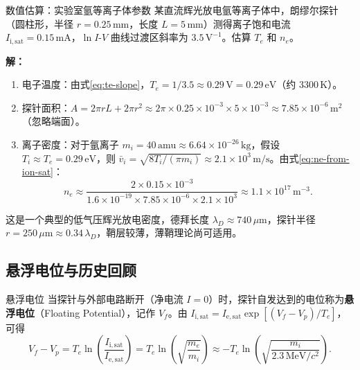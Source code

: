 \begin{example}{数值估算：实验室氩等离子体参数}{}{}
某直流辉光放电氩等离子体中，朗缪尔探针（圆柱形，半径 $r = 0.25\,\mathrm{mm}$，长度 $L = 5\,\mathrm{mm}$）测得离子饱和电流 $I_{\mathrm{i,sat}} = 0.15\,\mathrm{mA}$，$\ln I$-$V$ 曲线过渡区斜率为 $3.5\,\mathrm{V}^{-1}$。估算 $T_e$ 和 $n_e$。

\textbf{解：}
\begin{enumerate}
    \item 电子温度：由式\eqref{eq:te-slope}，$T_e = 1/3.5 \approx 0.29\,\mathrm{V} = 0.29\,\mathrm{eV}$（约 $3300\,\mathrm{K}$）。
    \item 探针面积：$A = 2\pi r L + 2\pi r^2 \approx 2\pi \times 0.25\times 10^{-3}\times 5\times 10^{-3} \approx 7.85\times 10^{-6}\,\mathrm{m}^2$（忽略端面）。
    \item 离子密度：对于氩离子 $m_i = 40\,\mathrm{amu} \approx 6.64\times 10^{-26}\,\mathrm{kg}$，假设 $T_i \approx T_e = 0.29\,\mathrm{eV}$，则 $\bar{v}_i = \sqrt{8T_i/(\pi m_i)} \approx 2.1\times 10^3\,\mathrm{m/s}$。由式\eqref{eq:ne-from-ion-sat}：
    \begin{equation}
    n_e \approx \frac{2\times 0.15\times 10^{-3}}{1.6\times 10^{-19}\times 7.85\times 10^{-6}\times 2.1\times 10^3} \approx 1.1\times 10^{17}\,\mathrm{m}^{-3}.
    \end{equation}
\end{enumerate}
这是一个典型的低气压辉光放电密度，德拜长度 $\lambda_D \approx 740\,\mu\mathrm{m}$，探针半径 $r = 250\,\mu\mathrm{m} \approx 0.34\,\lambda_D$，鞘层较薄，薄鞘理论尚可适用。
\end{example}

\subsection{悬浮电位与历史回顾}

\begin{definition}{悬浮电位}{}{}
当探针与外部电路断开（净电流 $I = 0$）时，探针自发达到的电位称为\textbf{悬浮电位}（Floating Potential），记作 $V_f$。由 $I_{\mathrm{i,sat}} = I_{\mathrm{e,sat}}\exp[(V_f - V_p)/T_e]$，可得
\begin{equation}
V_f - V_p = T_e \ln\!\left(\frac{I_{\mathrm{i,sat}}}{I_{\mathrm{e,sat}}}\right)
= T_e \ln\!\left(\sqrt{\frac{m_e}{m_i}}\right)
\approx -T_e \ln\!\left(\sqrt{\frac{m_i}{2.3\,\mathrm{MeV}/c^2}}\right).
\label{eq:floating-potential}
\end{equation}
\end{definition}

